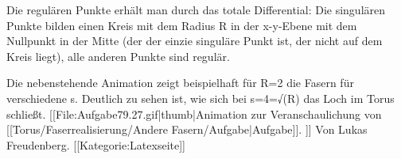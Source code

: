 Die regulären Punkte erhält man durch das totale Differential: Die singulären Punkte bilden einen Kreis mit dem Radius R in der x-y-Ebene mit dem Nullpunkt in der Mitte (der der einzie singuläre Punkt ist, der nicht auf dem Kreis liegt), alle anderen Punkte sind regulär.

Die nebenstehende Animation zeigt beispielhaft für R=2 die Fasern für verschiedene s. Deutlich zu sehen ist, wie sich bei s=4=√(R) das Loch im Torus schließt.
[[File:Aufgabe79.27.gif|thumb|Animation zur Veranschaulichung von
[[Torus/Faserrealisierung/Andere Fasern/Aufgabe|Aufgabe]].
]]
Von Lukas Freudenberg. [[Kategorie:Latexseite]]

